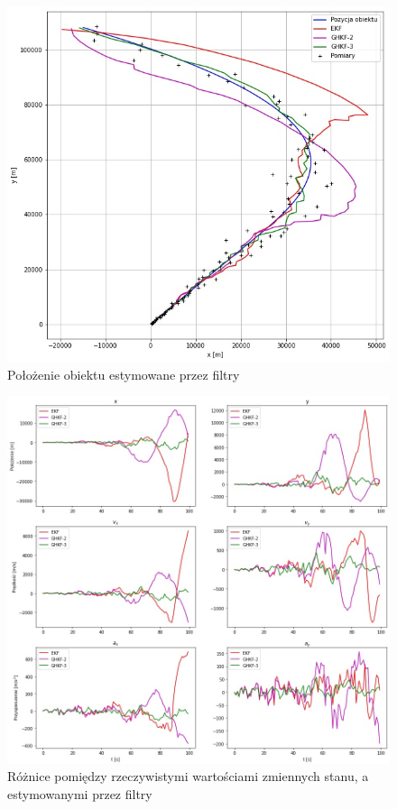 \begin{figure}
	\centering
	\includegraphics[width=\linewidth]{2D_tracking_positions.jpg}
	\caption{Położenie obiektu estymowane przez filtry}
	\label{fig:2D_tracking_positions}
\end{figure}
\begin{figure}
	\centering
	\includegraphics[width=\linewidth]{2D_tracking_errors.jpg}
	\caption{Różnice pomiędzy rzeczywistymi wartościami zmiennych stanu, a estymowanymi przez filtry}
	\label{fig:2D_tracking_errors}
\end{figure}
